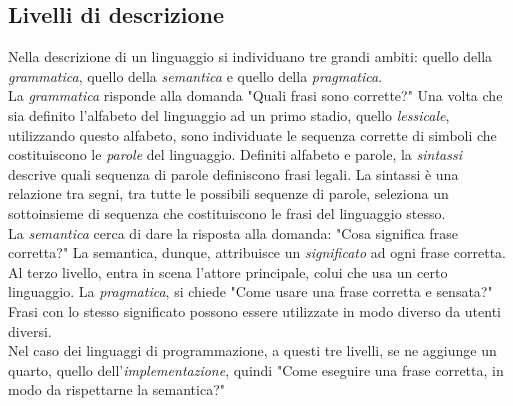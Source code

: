 \documentclass[12pt]{report}
\begin{document}
	\subsection{Livelli di descrizione}
	Nella descrizione di un linguaggio si individuano tre grandi ambiti: quello della \textit{grammatica}, quello della \textit{semantica} e quello della \textit{pragmatica}. \\
	La \textit{grammatica} risponde alla domanda "Quali frasi sono corrette?" Una volta che sia definito l'alfabeto del linguaggio ad un primo stadio, quello \textit{lessicale}, utilizzando questo alfabeto, sono individuate le sequenza corrette di simboli che costituiscono le \textit{parole} del linguaggio. Definiti alfabeto e parole, la \textit{sintassi} descrive quali sequenza di parole definiscono frasi legali. La sintassi è una relazione tra segni, tra tutte le possibili sequenze di parole, seleziona un sottoinsieme di sequenza che costituiscono le frasi del linguaggio stesso. \\
	La \textit{semantica} cerca di dare la risposta alla domanda: "Cosa significa frase corretta?" La semantica, dunque, attribuisce un \textit{significato} ad ogni frase corretta. \\
	Al terzo livello, entra in scena l'attore principale, colui che usa un certo linguaggio. La \textit{pragmatica}, si chiede "Come usare una frase corretta e sensata?" Frasi con lo stesso significato possono essere utilizzate in modo diverso da utenti diversi. \\
	Nel caso dei linguaggi di programmazione, a questi tre livelli, se ne aggiunge un quarto, quello dell'\textit{implementazione}, quindi "Come eseguire una frase corretta, in modo da rispettarne la semantica?"
\end{document}
